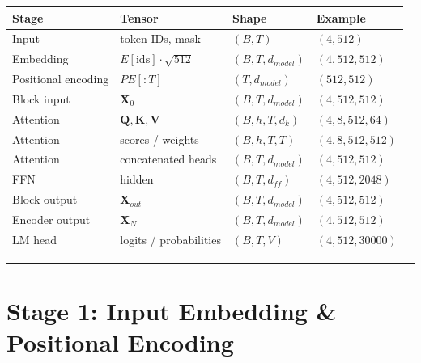 \documentclass[11pt,a4paper,oneside]{report}
\begin{document}
{\def\LTcaptype{none} %
\begin{longtable}[]{@{}llll@{}}
\toprule\noalign{}
Stage & Tensor & Shape & Example \\
\midrule\noalign{}
\endhead
\bottomrule\noalign{}
\endlastfoot
Input & token IDs, mask & \((B,\allowbreak T)\) & \((4,\allowbreak 512)\) \\
Embedding & \(E[\text{ids}] \cdot \sqrt{512}\) & \((B,\allowbreak T,\allowbreak d_{model})\) & \((4,\allowbreak 512,\allowbreak 512)\) \\
Positional encoding & \(PE[:T]\) & \((T,\allowbreak d_{model})\) & \((512,\allowbreak 512)\) \\
Block input & \(\mathbf{X}_0\) & \((B,\allowbreak T,\allowbreak d_{model})\) & \((4,\allowbreak 512,\allowbreak 512)\) \\
Attention & \(\mathbf{Q},\allowbreak \mathbf{K},\allowbreak \mathbf{V}\) & \((B,\allowbreak h,\allowbreak T,\allowbreak d_k)\) & \((4,\allowbreak 8,\allowbreak 512,\allowbreak 64)\) \\
Attention & scores / weights & \((B,\allowbreak h,\allowbreak T,\allowbreak T)\) & \((4,\allowbreak 8,\allowbreak 512,\allowbreak 512)\) \\
Attention & concatenated heads & \((B,\allowbreak T,\allowbreak d_{model})\) & \((4,\allowbreak 512,\allowbreak 512)\) \\
FFN & hidden & \((B,\allowbreak T,\allowbreak d_{ff})\) & \((4,\allowbreak 512,\allowbreak 2048)\) \\
Block output & \(\mathbf{X}_{out}\) & \((B,\allowbreak T,\allowbreak d_{model})\) & \((4,\allowbreak 512,\allowbreak 512)\) \\
Encoder output & \(\mathbf{X}_N\) & \((B,\allowbreak T,\allowbreak d_{model})\) & \((4,\allowbreak 512,\allowbreak 512)\) \\
LM head & logits / probabilities & \((B,\allowbreak T,\allowbreak V)\) & \((4,\allowbreak 512,\allowbreak 30000)\) \\
\end{longtable}
}

\begin{center}\rule{0.5\linewidth}{0.5pt}\end{center}

\section{Stage 1: Input Embedding \& Positional Encoding}\label{stage-1-input-embedding--positional-encoding}
\end{document}
